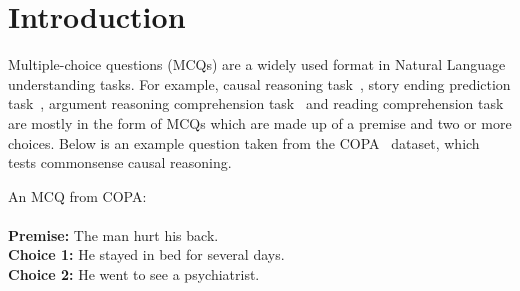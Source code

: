 \section{Introduction}
\label{sec:intro}

Multiple-choice questions (MCQs) are a widely used format 
in Natural Language understanding tasks. 
For example, causal reasoning task~\cite{copa2012}, story ending prediction task~\cite{roc2017},
argument reasoning comprehension task~\cite{arct2018} and reading comprehension task~\cite{yu2020reclor}
are mostly in the form of MCQs which are made up of a premise and 
two or more choices. Below is an example question taken 
from the COPA~\cite{copa2012} dataset, which tests commonsense causal 
reasoning.

\begin{example}\label{ex:copa}
An MCQ from COPA:\\ \\
\noindent
\textbf{Premise:} The man hurt his back.\\
\textbf{Choice 1:} He stayed in bed for several days.  \checksymbol \\
\textbf{Choice 2:} He went to see a psychiatrist. \crosssymbol 
\end{example}

